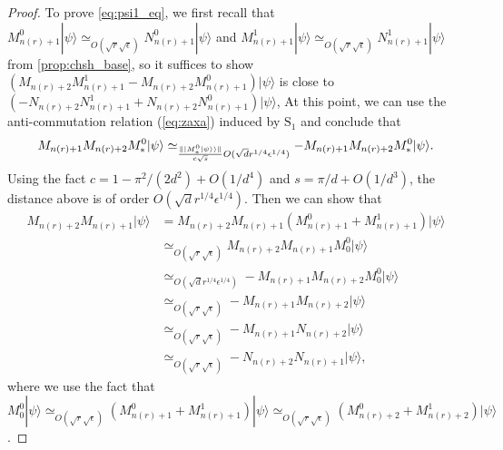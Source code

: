 \documentclass[11pt,letterpaper]{article}
\newcommand{\ket}[1]{|#1\rangle}
\DeclarePairedDelimiter{\norm}{\lVert}{\rVert}
\newcommand{\1}{\mathbb{1}}
\newcommand{\nr}{n(r)}
\newcommand{\bS}{\mathrm{S}}
\newcommand{\se}{\sqrt{\epsilon}}
\newcommand{\qe}{\epsilon^{1/4}}
\newcommand{\sd}{\sqrt{d}}
\newcommand{\sr}{\sqrt{r}}
\newcommand{\qr}{r^{1/4}}
\newcommand{\appd}[1]{\simeq_{#1}}
\theoremstyle{definition}
\begin{document}
\begin{proof}
	To prove \cref{eq:psi1_eq}, 
	we first recall that $M_{\nr+1}^0 \ket{\psi} \appd{O(\sr \se)} N_{\nr+1}^0 \ket{\psi}$ 
	and $M_{\nr+1}^1 \ket{\psi} \appd{O(\sr \se)} N_{\nr+1}^1 \ket{\psi}$ from \cref{prop:chsh_base},
	so it suffices to show
	$(M_{\nr+2}M_{\nr+1}^1 - M_{\nr+2}M_{\nr+1}^0) \ket{\psi}$ is close to $(- N_{\nr+2}N_{\nr+1}^1+N_{\nr+2}N_{\nr+1}^0)\ket{\psi}$,
	At this point, we can use the anti-commutation relation (\cref{eq:zaxa}) induced by $\bS_1$  and conclude that 
	\begin{align*}
		M_{\nr+1}M_{\nr+2} M_\ast^0 \ket{\psi} \appd{\frac{\norm{\ket{M_\ast^0\ket{\psi}}}}{c\sqrt{s}}O(\sd\qr\qe)} -M_{\nr+1}M_{\nr+2} M_\ast^0 \ket{\psi}.
	\end{align*}
	Using the fact $c = 1 - \pi^2/(2d^2) + O(1/d^4)$ and $s = \pi/d + O(1/d^3)$, the distance above is of order $O(\sd \qr \qe)$.
	Then we can show that 
	\begin{align*}
		M_{\nr+2}M_{\nr+1}\ket{\psi} &= M_{\nr+2}M_{\nr+1}(M_{\nr+1}^0 + M_{\nr+1}^1)\ket{\psi} \\
			&\appd{O(\sr\se)} M_{\nr+2}M_{\nr+1} M_0^0 \ket{\psi} \\
			&\appd{O(\sd \qr \qe)} -M_{\nr+1}M_{\nr+2} M_0^0 \ket{\psi}\\
			&\appd{O(\sr \se)} -M_{\nr+1}M_{\nr+2} \ket{\psi} \\
			&\appd{O(\sr \se)} -M_{\nr+1} N_{\nr+2} \ket{\psi} \\
			&\appd{O(\sr \se)} -N_{\nr+2} N_{\nr+1} \ket{\psi},
	\end{align*}
	where we use the fact that $M_0^0 \ket{\psi} \appd{O(\sr \se)} (M_{\nr+1}^0+M_{\nr+1}^1)\ket{\psi} \appd{O(\sr \se)}
	(M_{\nr+2}^0+M_{\nr+2}^1) \ket{\psi}$.


\end{proof}
\end{document}
